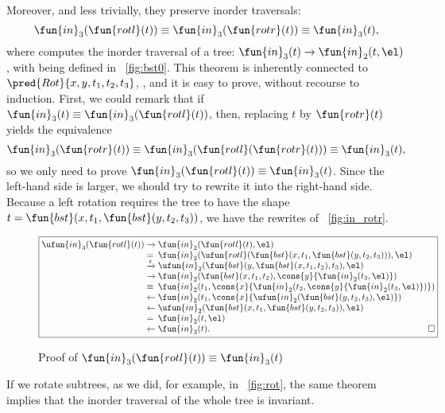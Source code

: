 Moreover, and less trivially, they preserve inorder traversals:
\begin{equation*}
  \abovedisplayskip=5pt
  \belowdisplayskip=5pt
  \fun{in}_3(\fun{rotl}(t)) \equiv \fun{in}_3(\fun{rotr}(t)) \equiv
  \fun{in}_3(t),
\end{equation*}
where  computes the
inorder traversal of a tree: \(\fun{in}_3(t) \rightarrow
\fun{in}_2(t,\el)\), with 
being defined in \fig~\vref{fig:bst0}. This theorem is inherently
connected to
\(\pred{Rot}{x,y,t_1,t_2,t_3}\),
, and it is easy to prove, without recourse to
induction. First, we could remark that if \(\fun{in}_3(t) \equiv
\fun{in}_3(\fun{rotl}(t))\), then, replacing \(t\) by
\(\fun{rotr}(t)\) yields the equivalence
\begin{equation*}
  \fun{in}_3(\fun{rotr}(t))
  \equiv \fun{in}_3(\fun{rotl}(\fun{rotr}(t))) \equiv \fun{in}_3(t),
\end{equation*}
so we only need to prove \(\fun{in}_3(\fun{rotl}(t)) \equiv
\fun{in}_3(t)\).  Since the left\hyp{}hand side is larger, we should
try to rewrite it into the right\hyp{}hand side. Because a left
rotation requires the tree to have the shape
\(t=\fun{bst}(x,t_1,\fun{bst}(y,t_2,t_3))\), we have the rewrites of
\fig~\vref{fig:in_rotr}.
\begin{figure}
  \begin{equation*}
    \boxed{
      \begin{array}{@{}r@{\;}l@{\;}l@{}}
  \ufun{in}_3(\fun{rotl}(t))
  & \rightarrow & \fun{in}_2(\fun{rotl}(t),\el)\\
  & = & \fun{in}_2(\ufun{rotl}(\fun{bst}(x,t_1,\fun{bst}(y,t_2,t_3))),\el)\\
  & \xrightarrow{\smash{\epsilon}} &
  \ufun{in}_2(\fun{bst}(y,\fun{bst}(x,t_1,t_2),t_3),\el)\\
  & \rightarrow &
  \fun{in}_2(\fun{bst}(x,t_1,t_2),\cons{y}{\fun{in}_2(t_3,\el)})\\
  & \equiv &
 \fun{in}_2(t_1,\cons{x}{\fun{in}_2(t_2,\cons{y}{\fun{in}_2(t_3,\el)})})\\
  & \leftarrow &
  \fun{in}_2(t_1,\cons{x}{\ufun{in}_2(\fun{bst}(y,t_2,t_3),\el)})\\
  & \leftarrow &
  \ufun{in}_2(\fun{bst}(x,t_1,\fun{bst}(y,t_2,t_3)),\el)\\
  & = &
  \fun{in}_2(t,\el)\\
  & \leftarrow &
  \fun{in}_3(t).\hfill\Box
\end{array}
}
\end{equation*}
\caption{Proof of \(\fun{in}_3(\fun{rotl}(t)) \equiv \fun{in}_3(t)\)}
\label{fig:in_rotr}
\end{figure}
If we rotate subtrees, as we did, for example, in \fig~\vref{fig:rot},
the same theorem implies that the inorder traversal of the whole tree
is invariant.

